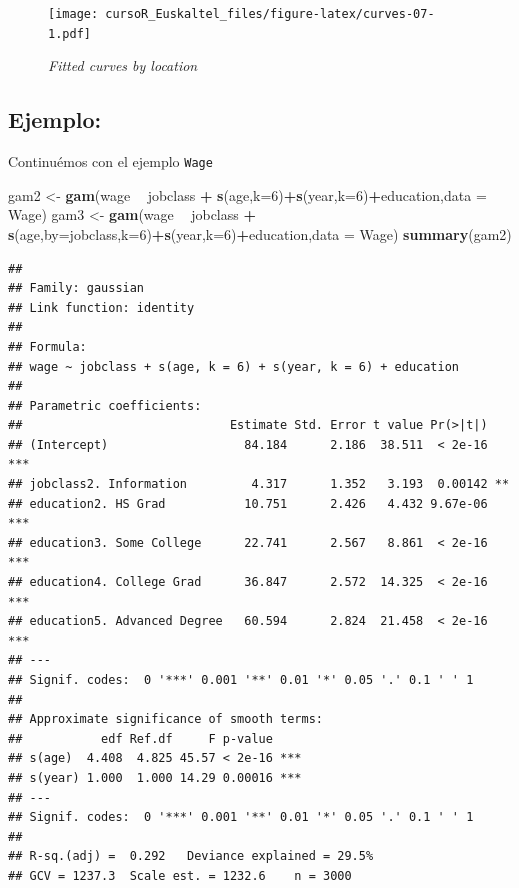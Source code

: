 \documentclass[]{book}
\newenvironment{Shaded}{\begin{snugshade}}{\end{snugshade}}
\newcommand{\KeywordTok}[1]{\textcolor[rgb]{0.13,0.29,0.53}{\textbf{#1}}}
\newcommand{\DataTypeTok}[1]{\textcolor[rgb]{0.13,0.29,0.53}{#1}}
\newcommand{\DecValTok}[1]{\textcolor[rgb]{0.00,0.00,0.81}{#1}}
\newcommand{\StringTok}[1]{\textcolor[rgb]{0.31,0.60,0.02}{#1}}
\newcommand{\OperatorTok}[1]{\textcolor[rgb]{0.81,0.36,0.00}{\textbf{#1}}}
\newcommand{\NormalTok}[1]{#1}
\begin{document}
\begin{figure}
\centering
\texttt{[image: cursoR\_Euskaltel\_files/figure-latex/curves-07-1.pdf]}
\caption{\label{fig:curves-07}\emph{Fitted curves by location}}
\end{figure}

\subsection{Ejemplo:}\label{ejemplo}

Continuémos con el ejemplo \texttt{Wage}

\begin{Shaded}
\begin{Highlighting}[]
\NormalTok{gam2 <-}\StringTok{ }\KeywordTok{gam}\NormalTok{(wage }\OperatorTok{~}\StringTok{ }\NormalTok{jobclass }\OperatorTok{+}\StringTok{ }\KeywordTok{s}\NormalTok{(age,}\DataTypeTok{k=}\DecValTok{6}\NormalTok{)}\OperatorTok{+}\KeywordTok{s}\NormalTok{(year,}\DataTypeTok{k=}\DecValTok{6}\NormalTok{)}\OperatorTok{+}\NormalTok{education,}\DataTypeTok{data =}\NormalTok{ Wage)}
\NormalTok{gam3 <-}\StringTok{ }\KeywordTok{gam}\NormalTok{(wage }\OperatorTok{~}\StringTok{ }\NormalTok{jobclass }\OperatorTok{+}\StringTok{ }\KeywordTok{s}\NormalTok{(age,}\DataTypeTok{by=}\NormalTok{jobclass,}\DataTypeTok{k=}\DecValTok{6}\NormalTok{)}\OperatorTok{+}\KeywordTok{s}\NormalTok{(year,}\DataTypeTok{k=}\DecValTok{6}\NormalTok{)}\OperatorTok{+}\NormalTok{education,}\DataTypeTok{data =}\NormalTok{ Wage)}
\KeywordTok{summary}\NormalTok{(gam2)}
\end{Highlighting}
\end{Shaded}

\begin{verbatim}
## 
## Family: gaussian 
## Link function: identity 
## 
## Formula:
## wage ~ jobclass + s(age, k = 6) + s(year, k = 6) + education
## 
## Parametric coefficients:
##                             Estimate Std. Error t value Pr(>|t|)    
## (Intercept)                   84.184      2.186  38.511  < 2e-16 ***
## jobclass2. Information         4.317      1.352   3.193  0.00142 ** 
## education2. HS Grad           10.751      2.426   4.432 9.67e-06 ***
## education3. Some College      22.741      2.567   8.861  < 2e-16 ***
## education4. College Grad      36.847      2.572  14.325  < 2e-16 ***
## education5. Advanced Degree   60.594      2.824  21.458  < 2e-16 ***
## ---
## Signif. codes:  0 '***' 0.001 '**' 0.01 '*' 0.05 '.' 0.1 ' ' 1
## 
## Approximate significance of smooth terms:
##           edf Ref.df     F p-value    
## s(age)  4.408  4.825 45.57 < 2e-16 ***
## s(year) 1.000  1.000 14.29 0.00016 ***
## ---
## Signif. codes:  0 '***' 0.001 '**' 0.01 '*' 0.05 '.' 0.1 ' ' 1
## 
## R-sq.(adj) =  0.292   Deviance explained = 29.5%
## GCV = 1237.3  Scale est. = 1232.6    n = 3000
\end{verbatim}
\end{document}
